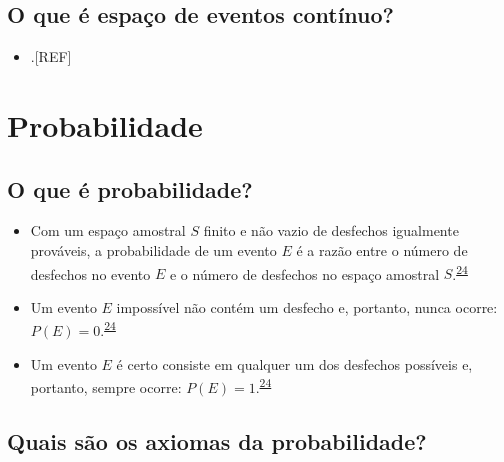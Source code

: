 \documentclass[
  a4paper,
]{book}
\providecommand{\tightlist}{%
  \setlength{\itemsep}{0pt}\setlength{\parskip}{0pt}}
\begin{document}
\hypertarget{o-que-uxe9-espauxe7o-de-eventos-contuxednuo}{%
\subsection{O que é espaço de eventos contínuo?}\label{o-que-uxe9-espauxe7o-de-eventos-contuxednuo}}

\begin{itemize}
\tightlist
\item
  .{[}REF{]}
\end{itemize}

\hypertarget{probabilidade}{%
\section{Probabilidade}\label{probabilidade}}

\hypertarget{o-que-uxe9-probabilidade}{%
\subsection{O que é probabilidade?}\label{o-que-uxe9-probabilidade}}

\begin{itemize}
\item
  Com um espaço amostral \(S\) finito e não vazio de desfechos igualmente prováveis, a probabilidade de um evento \(E\) é a razão entre o número de desfechos no evento \(E\) e o número de desfechos no espaço amostral \(S\).\textsuperscript{\protect\hyperlink{ref-grami2023}{24}}
\item
  Um evento \(E\) impossível não contém um desfecho e, portanto, nunca ocorre: \(P(E)=0\).\textsuperscript{\protect\hyperlink{ref-grami2023}{24}}
\item
  Um evento \(E\) é certo consiste em qualquer um dos desfechos possíveis e, portanto, sempre ocorre: \(P(E)=1\).\textsuperscript{\protect\hyperlink{ref-grami2023}{24}}
\end{itemize}

\hypertarget{quais-suxe3o-os-axiomas-da-probabilidade}{%
\subsection{Quais são os axiomas da probabilidade?}\label{quais-suxe3o-os-axiomas-da-probabilidade}}
\end{document}

